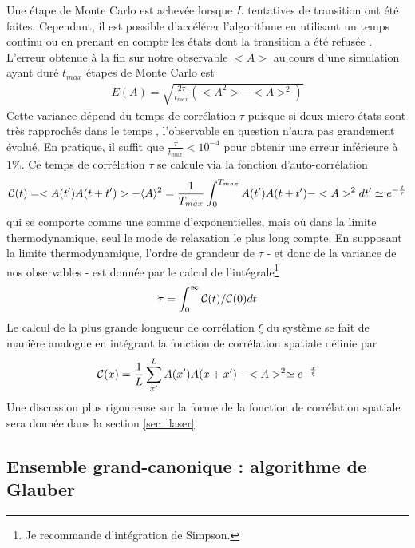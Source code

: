 Une étape de Monte Carlo est achevée lorsque $L$ tentatives de transition ont été faites. Cependant, il est possible d'accélérer l'algorithme en utilisant un temps continu \cite{newman_monte_1999} ou en prenant en compte les états dont la transition a été refusée \cite{frenkel_speed-up_2004}.
L'erreur obtenue à la fin sur notre observable $<A>$ au cours d'une simulation ayant duré $t_{max}$ étapes de Monte Carlo est 
\begin{align}
	E(A) = \sqrt{\frac{2 \tau}{t_{max}} (<A^2>-<A>^2)} 
\end{align}
Cette variance dépend du temps de corrélation $\tau$ puisque si deux micro-états sont très rapprochés dans le temps , l'observable en question n'aura pas grandement évolué. En pratique, il suffit que $\frac{\tau}{t_{max}} \less 10^{-4}$ pour obtenir une erreur inférieure à $1\%$. Ce temps de corrélation $\tau$ se calcule via la fonction d'auto-corrélation 
\begin{align}
\mathcal{C}(t) = <A(t')A(t+t')>-\langle A \rangle^2 = \frac{1}{T_{max}}\int_0^{T_{max}}A(t')A(t+t')-<A>^2 dt' \simeq e^{-\frac{t}{\tau}}
\end{align}
qui se comporte comme une somme d'exponentielles, mais où dans la limite thermodynamique, seul le mode de relaxation le plus long compte\cite{wansleben_monte_1991}. En supposant la limite thermodynamique, l'ordre de grandeur de $\tau$ - et donc de la variance de nos observables - est donnée par le calcul de l'intégrale\footnote{Je recommande d'intégration de Simpson.}
\begin{align}
	\tau = \int_0^{\infty} \mathcal{C}(t)/\mathcal{C}(0) dt
	\label{tau_cor}
\end{align}
Le calcul de la plus grande longueur de corrélation $\xi$ du système se fait de manière analogue en intégrant la fonction de corrélation spatiale définie par
\begin{align}
\mathcal{C}(x) = \frac{1}{L} \sum_{x'}^L A(x')A(x+x')-<A>^2 \simeq e^{-\frac{x}{\xi}}
\end{align}
Une discussion plus rigoureuse sur la forme de la fonction de corrélation spatiale sera donnée dans la section \ref{sec_laser}.

	\subsection{Ensemble grand-canonique : algorithme de Glauber}

